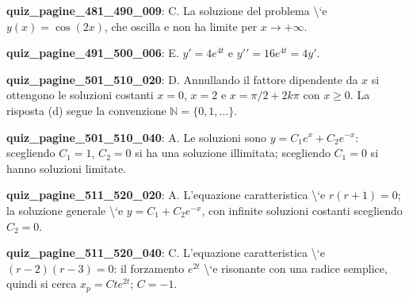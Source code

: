 \documentclass[11pt,a4paper]{article}
\newcounter{quiz}
\begin{document}
\noindent\textbf{quiz\_pagine\_481\_490\_009}: C. La soluzione del problema \textbackslash{}`e $y(x)=\cos(2x)$, che oscilla e non ha limite per $x\to+\infty$.\par\medskip
\noindent\textbf{quiz\_pagine\_491\_500\_006}: E. $y\prime=4e^{4t}$ e $y\prime\prime=16e^{4t}=4y\prime$.\par\medskip
\noindent\textbf{quiz\_pagine\_501\_510\_020}: D. Annullando il fattore dipendente da $x$ si ottengono le soluzioni costanti $x=0$, $x=2$ e $x=\pi/2+2k\pi$ con $x\ge0$. La risposta (d) segue la convenzione $\mathbb N=\{0,1,\dots\}$.\par\medskip
\noindent\textbf{quiz\_pagine\_501\_510\_040}: A. Le soluzioni sono $y=C_1e^x+C_2e^{-x}$: scegliendo $C_1=1$, $C_2=0$ si ha una soluzione illimitata; scegliendo $C_1=0$ si hanno soluzioni limitate.\par\medskip
\noindent\textbf{quiz\_pagine\_511\_520\_020}: A. L'equazione caratteristica \textbackslash{}`e $r(r+1)=0$; la soluzione generale \textbackslash{}`e $y=C_1+C_2e^{-x}$, con infinite soluzioni costanti scegliendo $C_2=0$.\par\medskip
\noindent\textbf{quiz\_pagine\_511\_520\_040}: C. L'equazione caratteristica \textbackslash{}`e $(r-2)(r-3)=0$: il forzamento $e^{2t}$ \textbackslash{}`e risonante con una radice semplice, quindi si cerca $x_p=Cte^{2t}$; $C=-1$.\par\medskip
\end{document}
